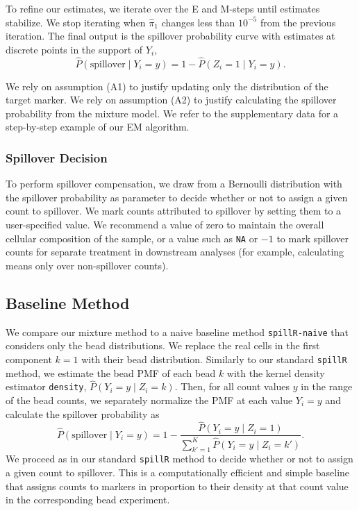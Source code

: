 \documentclass{bioinfo}
\begin{document}
To refine our estimates, we iterate over the E and M-steps until
estimates stabilize. We stop iterating when \(\hat{\pi}_1\) changes less
than \(10^{-5}\) from the previous iteration. The final output is the
spillover probability curve with estimates at discrete points in the
support of \(Y_i\), \[
\widehat{P}(\text{spillover} \mid Y_i = y) = 1 - \widehat{P}(Z_i = 1 \mid Y_i = y).
\]

We rely on assumption (A1) to justify updating only the distribution of
the target marker. We rely on assumption (A2) to justify calculating the
spillover probability from the mixture model. We refer to the
supplementary data for a step-by-step example of our EM algorithm.

\subsubsection{Spillover Decision}

To perform spillover compensation, we draw from a Bernoulli distribution
with the spillover probability as parameter to decide whether or not to
assign a given count to spillover. We mark counts attributed to
spillover by setting them to a user-specified value. We recommend a
value of zero to maintain the overall cellular composition of the
sample, or a value such as \texttt{NA} or \(-1\) to mark spillover
counts for separate treatment in downstream analyses (for example,
calculating means only over non-spillover counts).

\subsection{Baseline Method}

We compare our mixture method to a naive baseline method
\texttt{spillR-naive} that considers only the bead distributions. We
replace the real cells in the first component \(k = 1\) with their bead
distribution. Similarly to our standard \texttt{spillR} method, we
estimate the bead PMF of each bead \(k\) with the kernel density
estimator \texttt{density}, \(\widehat{P}(Y_i = y \mid Z_i = k)\). Then,
for all count values \(y\) in the range of the bead counts, we
separately normalize the PMF at each value \(Y_i = y\) and calculate the
spillover probability as \[
\widehat{P}(\text{spillover} \mid Y_i = y) = 1 - \frac{\widehat{P}(Y_i = y \mid Z_i = 1)}{\sum_{k' = 1}^K \widehat{P}(Y_i = y \mid Z_i = k')}.
\] We proceed as in our standard \texttt{spillR} method to decide
whether or not to assign a given count to spillover. This is a
computationally efficient and simple baseline that assigns counts to
markers in proportion to their density at that count value in the
corresponding bead experiment.
\end{document}
